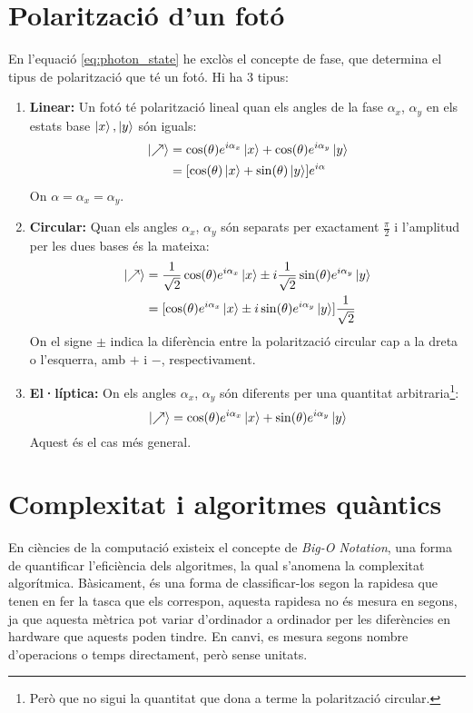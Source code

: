 \chapter{Polarització d'un fotó}
\label{appendix:optics}
En l'equació \ref{eq:photon_state} he exclòs el concepte de fase, que determina el tipus de polarització que té un fotó. Hi ha 3 tipus:
\begin{enumerate}
	\item \textbf{Linear:}
	Un fotó té polarització lineal quan els angles de la fase $\alpha_x$, $\alpha_y$ en els estats base $\ket{x},\ket{y}$ són iguals:
	\begin{align*}
		\ket{\nearrow} &= \cos(\theta) e^{i\alpha_x}\ket{x} + \cos(\theta)e^{i\alpha_y}\ket{y} \\
		&= [\cos(\theta)\ket{x} + \sin(\theta)\ket{y}]e^{i\alpha}
	\end{align*}
	On $\alpha=\alpha_x=\alpha_y$.
	\item \textbf{Circular:}
	Quan els angles $\alpha_x$, $\alpha_y$ són separats per exactament $\frac{\pi}{2}$ i l'amplitud per les dues bases és la mateixa:
	\begin{align*}
		\ket{\nearrow} &= \frac{1}{\sqrt{2}}\cos(\theta)e^{i\alpha_x}\ket{x} \pm i\frac{1}{\sqrt{2}}\sin(\theta)e^{i\alpha_y}\ket{y} \\
					   &= [\cos(\theta)e^{i\alpha_x}\ket{x} \pm i\sin(\theta)e^{i\alpha_y}\ket{y}]\frac{1}{\sqrt{2}}
	\end{align*}
	On el signe $\pm$ indica la diferència entre la polarització circular cap a la dreta o l'esquerra, amb $+$ i $-$, respectivament.
	\item \textbf{El·líptica:}
	On els angles $\alpha_x$, $\alpha_y$ són diferents per una quantitat arbitraria\footnote{Però que no sigui la quantitat que dona a terme la polarització circular.}:
	$$
	\ket{\nearrow} = \cos(\theta)e^{i\alpha_x}\ket{x} + \sin(\theta)e^{i\alpha_y}\ket{y}
	$$
	Aquest és el cas més general.
	
\end{enumerate}

\chapter{Complexitat i algoritmes quàntics}
\label{complexity}
En ciències de la computació existeix el concepte de \textit{Big-O Notation}, una forma de quantificar l'eficiència dels algoritmes, la qual s'anomena la complexitat algorítmica. Bàsicament, és una forma de classificar-los segon la rapidesa que tenen en fer la tasca que els correspon, aquesta rapidesa no és mesura en segons, ja que aquesta mètrica pot variar d'ordinador a ordinador per les diferències en hardware que aquests poden tindre. En canvi, es mesura segons nombre d'operacions o temps directament, però sense unitats.

